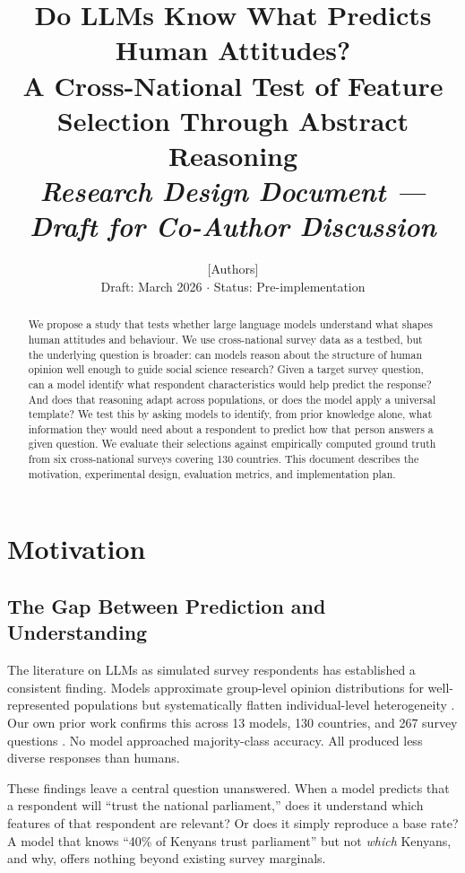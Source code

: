 \documentclass[11pt]{article}
\title{\textbf{Do LLMs Know What Predicts Human Attitudes?}\\[6pt]
\large A Cross-National Test of Feature Selection Through Abstract Reasoning\\[12pt]
\normalsize \textit{Research Design Document --- Draft for Co-Author Discussion}}
\author{[Authors]\\[4pt]
\small Draft: March 2026 \quad $\cdot$ \quad Status: Pre-implementation}
\date{}
\begin{document}
\maketitle

\begin{abstract}
\noindent
We propose a study that tests whether large language models understand what shapes human attitudes and behaviour. We use cross-national survey data as a testbed, but the underlying question is broader: can models reason about the structure of human opinion well enough to guide social science research? Given a target survey question, can a model identify what respondent characteristics would help predict the response? And does that reasoning adapt across populations, or does the model apply a universal template? We test this by asking models to identify, from prior knowledge alone, what information they would need about a respondent to predict how that person answers a given question. We evaluate their selections against empirically computed ground truth from six cross-national surveys covering 130 countries. This document describes the motivation, experimental design, evaluation metrics, and implementation plan.
\end{abstract}


\section{Motivation}

\subsection{The Gap Between Prediction and Understanding}

The literature on LLMs as simulated survey respondents has established a consistent finding. Models approximate group-level opinion distributions for well-represented populations but systematically flatten individual-level heterogeneity \citep{hu2025simbench, wang2025large, bisbee2024synthetic}. Our own prior work confirms this across 13 models, 130 countries, and 267 survey questions \citep{paper1}. No model approached majority-class accuracy. All produced less diverse responses than humans.

These findings leave a central question unanswered. When a model predicts that a respondent will ``trust the national parliament,'' does it understand which features of that respondent are relevant? Or does it simply reproduce a base rate? A model that knows ``40\% of Kenyans trust parliament'' but not \textit{which} Kenyans, and why, offers nothing beyond existing survey marginals.
\end{document}
